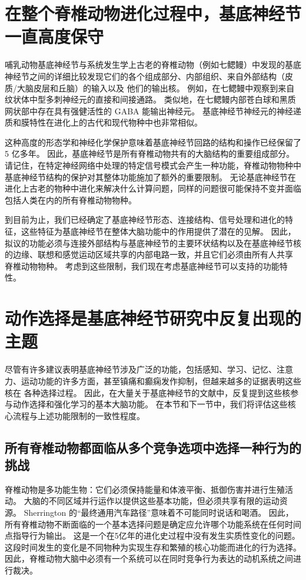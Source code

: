 \section{在整个脊椎动物进化过程中，基底神经节一直高度保守}

哺乳动物基底神经节与系统发生学上古老的脊椎动物（例如七鳃鳗）中发现的基底神经节之间的详细比较发现它们的各个组成部分、内部组织、来自外部结构（皮质/大脑皮层和丘脑）的输入以及 他们的输出核。 例如，在七鳃鳗中观察到来自纹状体中型多刺神经元的直接和间接通路。 类似地，在七鳃鳗内部苍白球和黑质网状部中存在具有强健活性的 GABA 能输出神经元。 基底神经节神经元的神经递质和膜特性在进化上的古代和现代物种中也非常相似。

这种高度的形态学和神经化学保护意味着基底神经节回路的结构和操作已经保留了 5 亿多年。 因此，基底神经节是所有脊椎动物共有的大脑结构的重要组成部分。 请记住，在特定神经网络中处理的特定信号模式会产生一种功能，脊椎动物物种中基底神经节结构的保护对其整体功能施加了额外的重要限制。 无论基底神经节在进化上古老的物种中进化来解决什么计算问题，同样的问题很可能保持不变并面临包括人类在内的所有脊椎动物物种。

到目前为止，我们已经确定了基底神经节形态、连接结构、信号处理和进化的特征，这些特征为基底神经节在整体大脑功能中的作用提供了潜在的见解。 因此，拟议的功能必须与连接外部结构与基底神经节的主要环状结构以及在基底神经节核的边缘、联想和感觉运动区域共享的内部电路一致，并且它们必须由所有人共享 脊椎动物物种。 考虑到这些限制，我们现在考虑基底神经节可以支持的功能特性。

\section{动作选择是基底神经节研究中反复出现的主题}
尽管有许多建议表明基底神经节涉及广泛的功能，包括感知、学习、记忆、注意力、运动功能的许多方面，甚至镇痛和癫痫发作抑制，但越来越多的证据表明这些核在 各种选择过程。 因此，在大量关于基底神经节的文献中，反复提到这些核参与动作选择和强化学习的基本大脑功能。 在本节和下一节中，我们将评估这些核心流程与上述功能限制的一致性程度。

\subsection{所有脊椎动物都面临从多个竞争选项中选择一种行为的挑战}
脊椎动物是多功能生物：它们必须保持能量和体液平衡、抵御伤害并进行生殖活动。 大脑的不同区域并行运作以提供这些基本功能，但必须共享有限的运动资源。 Sherrington 的“最终通用汽车路径”意味着不可能同时说话和喝酒。 因此，所有脊椎动物不断面临的一个基本选择问题是确定应允许哪个功能系统在任何时间点指导行为输出。 这是一个在5亿年的进化史过程中没有发生实质性变化的问题。 这段时间发生的变化是不同物种为实现生存和繁殖的核心功能而进化的行为选择。 因此，脊椎动物大脑中必须有一个系统可以在同时竞争行为表达的动机系统之间进行裁决。

